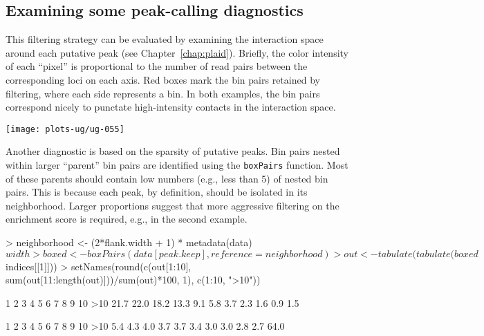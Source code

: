 \documentclass[12pt]{report}
\renewenvironment{Schunk}{\vspace{0pt}}{\vspace{0pt}}
\newcommand{\code}[1]{{\small\texttt{#1}}}
\begin{document}
\subsection{Examining some peak-calling diagnostics}
This filtering strategy can be evaluated by examining the interaction space around each putative peak (see Chapter~\ref{chap:plaid}).
Briefly, the color intensity of each ``pixel'' is proportional to the number of read pairs between the corresponding loci on each axis.
Red boxes mark the bin pairs retained by filtering, where each side represents a bin.
In both examples, the bin pairs correspond nicely to punctate high-intensity contacts in the interaction space.

\begin{center}
\texttt{[image: plots-ug/ug-055]}
\end{center}

Another diagnostic is based on the sparsity of putative peaks.
Bin pairs nested within larger ``parent'' bin pairs are identified using the \code{boxPairs} function.
Most of these parents should contain low numbers (e.g., less than 5) of nested bin pairs.
This is because each peak, by definition, should be isolated in its neighborhood.
Larger proportions suggest that more aggressive filtering on the enrichment score is required, e.g., in the second example. 

\begin{Schunk}
\begin{Sinput}
> neighborhood <- (2*flank.width + 1) * metadata(data)$width
> boxed <- boxPairs(data[peak.keep], reference=neighborhood)
> out <- tabulate(tabulate(boxed$indices[[1]]))
> setNames(round(c(out[1:10], sum(out[11:length(out)]))/sum(out)*100, 1), c(1:10, ">10"))
\end{Sinput}
\begin{Soutput}
   1    2    3    4    5    6    7    8    9   10  >10 
21.7 22.0 18.2 13.3  9.1  5.8  3.7  2.3  1.6  0.9  1.5 
\end{Soutput}
\begin{Soutput}
   1    2    3    4    5    6    7    8    9   10  >10 
 5.4  4.3  4.0  3.7  3.7  3.4  3.0  3.0  2.8  2.7 64.0 
\end{Soutput}
\end{Schunk}
\end{document}
